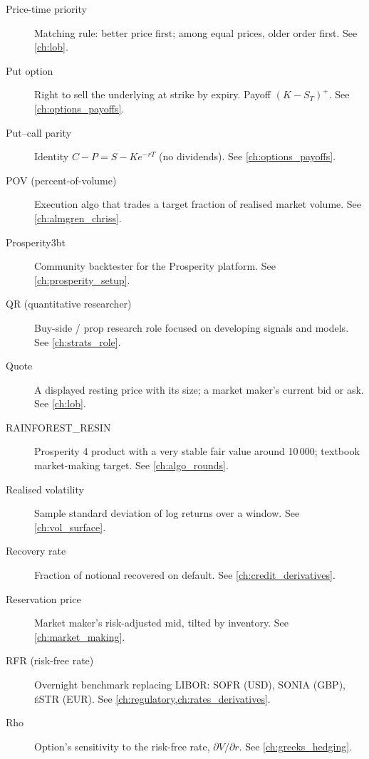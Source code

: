 \begin{description}
\item[Price-time priority]
Matching rule: better price first; among equal prices, older order
first. See \cref{ch:lob}.

\item[Put option]
Right to sell the underlying at strike by expiry. Payoff $(K-S_T)^+$.
See \cref{ch:options_payoffs}.

\item[Put--call parity]
Identity $C - P = S - K e^{-rT}$ (no dividends). See \cref{ch:options_payoffs}.

\item[POV (percent-of-volume)]
Execution algo that trades a target fraction of realised market volume.
See \cref{ch:almgren_chriss}.

\item[Prosperity3bt]
Community backtester for the Prosperity platform. See \cref{ch:prosperity_setup}.

\item[QR (quantitative researcher)]
Buy-side / prop research role focused on developing signals and models.
See \cref{ch:strats_role}.

\item[Quote]
A displayed resting price with its size; a market maker's current bid
or ask. See \cref{ch:lob}.

\item[RAINFOREST\_RESIN]
Prosperity 4 product with a very stable fair value around 10\,000;
textbook market-making target. See \cref{ch:algo_rounds}.

\item[Realised volatility]
Sample standard deviation of log returns over a window. See \cref{ch:vol_surface}.

\item[Recovery rate]
Fraction of notional recovered on default. See \cref{ch:credit_derivatives}.

\item[Reservation price]
Market maker's risk-adjusted mid, tilted by inventory. See \cref{ch:market_making}.

\item[RFR (risk-free rate)]
Overnight benchmark replacing LIBOR: SOFR (USD), SONIA (GBP), \textsc{\'e}STR
(EUR). See \cref{ch:regulatory,ch:rates_derivatives}.

\item[Rho]
Option's sensitivity to the risk-free rate, $\partial V/\partial r$. See \cref{ch:greeks_hedging}.


\end{description}
